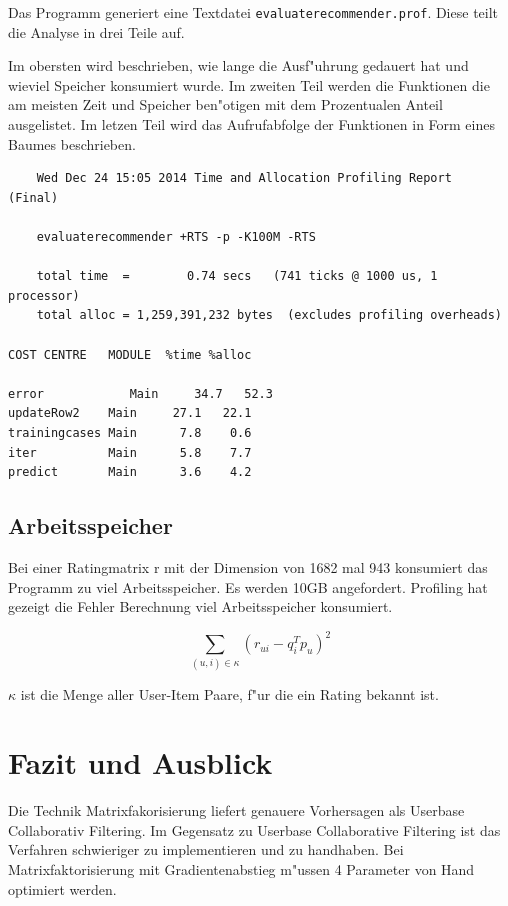 \documentclass[a4paper, 12pt]{article}
\begin{document}
Das Programm generiert eine Textdatei \verb|evaluaterecommender.prof|. Diese teilt die Analyse in drei Teile auf.

Im obersten wird beschrieben, wie lange die Ausf"uhrung gedauert hat und wieviel Speicher konsumiert wurde. Im zweiten Teil werden die Funktionen die am meisten Zeit und Speicher ben"otigen mit dem Prozentualen Anteil ausgelistet. Im letzen Teil wird das Aufrufabfolge der Funktionen in Form eines Baumes beschrieben.

\begin{verbatim}
	Wed Dec 24 15:05 2014 Time and Allocation Profiling Report  (Final)

	evaluaterecommender +RTS -p -K100M -RTS

	total time  =        0.74 secs   (741 ticks @ 1000 us, 1 processor)
	total alloc = 1,259,391,232 bytes  (excludes profiling overheads)

COST CENTRE   MODULE  %time %alloc

error            Main     34.7   52.3
updateRow2    Main     27.1   22.1
trainingcases Main      7.8    0.6
iter          Main      5.8    7.7
predict       Main      3.6    4.2

\end{verbatim}

\subsection{Arbeitsspeicher}
\label{sec:memory}



Bei einer Ratingmatrix r mit der Dimension von 1682 mal 943 konsumiert das Programm zu viel Arbeitsspeicher. Es werden 10GB angefordert. Profiling hat gezeigt die Fehler Berechnung viel Arbeitsspeicher konsumiert.

\begin{equation}
  \label{eq:squareerror}
  \sum_{(u,i) \in \kappa} (r_{ui} - q_i^T p_u)^2
\end{equation}

$\kappa$ ist die Menge aller User-Item Paare, f"ur die ein Rating bekannt ist.

\section{Fazit und Ausblick}
\label{sec:fazit}

Die Technik Matrixfakorisierung liefert genauere Vorhersagen als Userbase Collaborativ Filtering. Im Gegensatz zu Userbase Collaborative Filtering ist das Verfahren schwieriger zu implementieren und zu handhaben. Bei Matrixfaktorisierung mit Gradientenabstieg m"ussen 4 Parameter von Hand optimiert werden.
\end{document}
